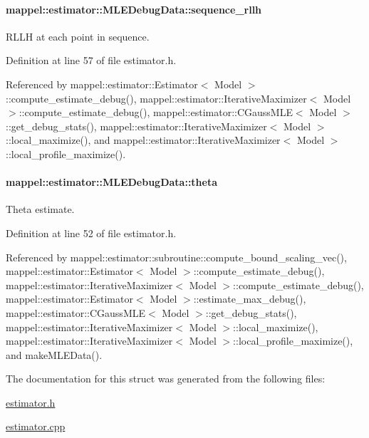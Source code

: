 \paragraph[{\texorpdfstring{sequence\+\_\+rllh}{sequence_rllh}}]{ mappel\+::estimator\+::\+M\+L\+E\+Debug\+Data\+::sequence\+\_\+rllh}\hypertarget{structmappel_1_1estimator_1_1MLEDebugData_a4e8b3ce8d1925480aadd942d34505568}{}\label{structmappel_1_1estimator_1_1MLEDebugData_a4e8b3ce8d1925480aadd942d34505568}


R\+L\+LH at each point in sequence. 



Definition at line 57 of file estimator.\+h.



Referenced by mappel\+::estimator\+::\+Estimator$<$ Model $>$\+::compute\+\_\+estimate\+\_\+debug(), mappel\+::estimator\+::\+Iterative\+Maximizer$<$ Model $>$\+::compute\+\_\+estimate\+\_\+debug(), mappel\+::estimator\+::\+C\+Gauss\+M\+L\+E$<$ Model $>$\+::get\+\_\+debug\+\_\+stats(), mappel\+::estimator\+::\+Iterative\+Maximizer$<$ Model $>$\+::local\+\_\+maximize(), and mappel\+::estimator\+::\+Iterative\+Maximizer$<$ Model $>$\+::local\+\_\+profile\+\_\+maximize().

\paragraph[{\texorpdfstring{theta}{theta}}]{ mappel\+::estimator\+::\+M\+L\+E\+Debug\+Data\+::theta}\hypertarget{structmappel_1_1estimator_1_1MLEDebugData_a9f62b8797034f80b369117f77ba39725}{}\label{structmappel_1_1estimator_1_1MLEDebugData_a9f62b8797034f80b369117f77ba39725}


Theta estimate. 



Definition at line 52 of file estimator.\+h.



Referenced by mappel\+::estimator\+::subroutine\+::compute\+\_\+bound\+\_\+scaling\+\_\+vec(), mappel\+::estimator\+::\+Estimator$<$ Model $>$\+::compute\+\_\+estimate\+\_\+debug(), mappel\+::estimator\+::\+Iterative\+Maximizer$<$ Model $>$\+::compute\+\_\+estimate\+\_\+debug(), mappel\+::estimator\+::\+Estimator$<$ Model $>$\+::estimate\+\_\+max\+\_\+debug(), mappel\+::estimator\+::\+C\+Gauss\+M\+L\+E$<$ Model $>$\+::get\+\_\+debug\+\_\+stats(), mappel\+::estimator\+::\+Iterative\+Maximizer$<$ Model $>$\+::local\+\_\+maximize(), mappel\+::estimator\+::\+Iterative\+Maximizer$<$ Model $>$\+::local\+\_\+profile\+\_\+maximize(), and make\+M\+L\+E\+Data().



The documentation for this struct was generated from the following files\+:\begin{DoxyCompactItemize}
\item 
\hyperlink{estimator_8h}{estimator.\+h}\item 
\hyperlink{estimator_8cpp}{estimator.\+cpp}\end{DoxyCompactItemize}
